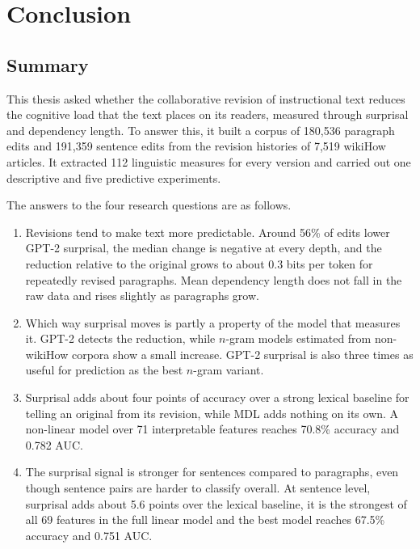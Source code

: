 \documentclass[12pt,a4paper,oneside]{report}
\begin{document}
\chapter{Conclusion}
\label{ch:conclusion}

\section{Summary}
This thesis asked whether the collaborative revision of instructional text reduces the cognitive load that the text places on its readers, measured through surprisal and dependency length. To answer this, it built a corpus of 180{,}536 paragraph edits and 191{,}359 sentence edits from the revision histories of 7{,}519 wikiHow articles. It extracted 112 linguistic measures for every version and carried out one descriptive and five predictive experiments.

The answers to the four research questions are as follows.
\begin{enumerate}[label=\textbf{RQ\arabic*.},leftmargin=*]
  \item Revisions tend to make text more predictable. Around 56\% of edits lower GPT-2 surprisal, the median change is negative at every depth, and the reduction relative to the original grows to about 0.3 bits per token for repeatedly revised paragraphs. Mean dependency length does not fall in the raw data and rises slightly as paragraphs grow.
  \item Which way surprisal moves is partly a property of the model that measures it. GPT-2 detects the reduction, while $n$-gram models estimated from non-wikiHow corpora show a small increase. GPT-2 surprisal is also three times as useful for prediction as the best $n$-gram variant.
  \item Surprisal adds about four points of accuracy over a strong lexical baseline for telling an original from its revision, while MDL adds nothing on its own. A non-linear model over 71 interpretable features reaches 70.8\% accuracy and 0.782 AUC.
\item The surprisal signal is stronger for sentences compared to paragraphs, even though sentence pairs are harder to classify overall. At sentence level, surprisal adds about 5.6 points over the lexical baseline, it is the strongest of all 69 features in the full linear model and the best model reaches 67.5\% accuracy and 0.751 AUC.
\end{enumerate}
\end{document}
